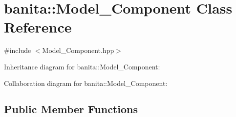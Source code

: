 \hypertarget{classbanita_1_1_model___component}{}\section{banita\+::Model\+\_\+\+Component Class Reference}
\label{classbanita_1_1_model___component}


{\ttfamily \#include $<$Model\+\_\+\+Component.\+hpp$>$}



Inheritance diagram for banita\+::Model\+\_\+\+Component\+:


Collaboration diagram for banita\+::Model\+\_\+\+Component\+:
\subsection*{Public Member Functions}
